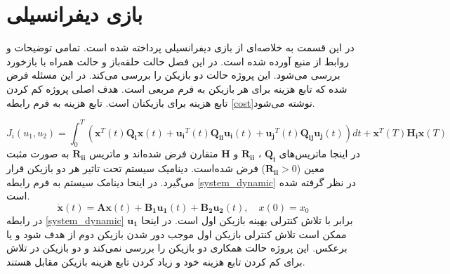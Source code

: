 \chapter{بازی دیفرانسیلی}
در این قسمت به خلاصه‌ای از بازی دیفرانسیلی پرداخته شده است. تمامی توضیحات و روابط  از منبع 
 \cite{article1}
آورده شده است. در این فصل حالت حلقه‌باز
 و حالت همراه با بازخورد بررسی می‌شود.
 این پروژه حالت دو بازیکن را بررسی می‌کند. در این مسئله فرض شده  که تابع هزینه برای هر بازیکن به فرم مربعی است. 	هدف اصلی پروژه کم کردن تابع هزینه برای بازیکنان است. تابع هزینه به فرم رابطه \ref{cost}نوشته می‌شود.

 \begin{equation}\label{cost}
 	J_i(u_1, u_2) = \int_{0}^{T}\left( \boldsymbol{x} ^T(t) \boldsymbol{Q_i} \boldsymbol{x}(t)+
 	 \boldsymbol{u_i} ^T(t) \boldsymbol{Q_{ii}} \boldsymbol{u_i}(t)+
 	 \boldsymbol{u_j} ^T(t)\boldsymbol{ Q_{ij} u_j}(t)
 	\right)dt+
 	\boldsymbol{ x} ^T(T)\boldsymbol{ H_i}\boldsymbol{ x}(T) 
  \end{equation}
در اینجا ماتریس‌های 
$\boldsymbol{Q_i}$ ، $\boldsymbol{R_{ii}}$
و
$\boldsymbol{H}$
متقارن فرض شده‌اند و ماتریس 
$\boldsymbol{R_{ii}}$
به صورت مثبت معین ($\boldsymbol{R_{ii}}>0$)
فرض شده‌است.
دینامیک سیستم تحت تاثیر هر دو بازیکن قرار می‌گیرد. در اینحا دینامک سیستم به فرم رابطه \ref{system_dynamic} در نظر گرفته شده ‌است.
\begin{equation}\label{system_dynamic}
	\boldsymbol{\dot x}(t) = \boldsymbol{Ax}(t) + \boldsymbol{B_1u_1}(t) + \boldsymbol{B_2u_2}(t), \quad x(0) = x_0
\end{equation}
در رابطه 
\ref{system_dynamic}
$\boldsymbol{u_1}$
برابر با تلاش کنترلی بهینه بازیکن اول است. در اینحا ممکن است تلاش کنترلی بازیکن اول موجب دور شدن بازیکن دوم از هدف شود و یا برعکس.  این پروژه حالت همکاری دو بازیکن را بررسی نمی‌کند و دو بازیکن در تلاش برای کم کردن تابع هزینه خود و زیاد کردن تابع هزینه بازیکن مقابل هستند.
